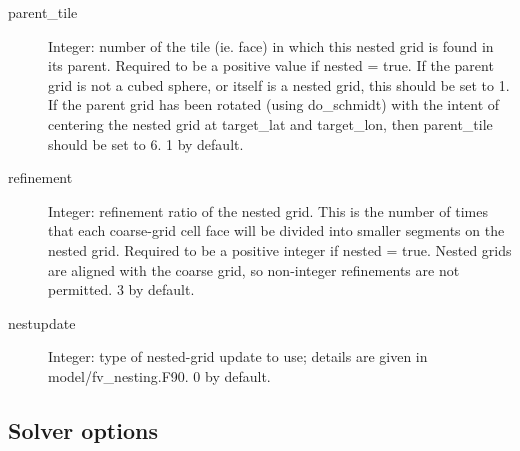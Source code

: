 \documentclass[12pt,letterpaper]{book}
\begin{document}
\begin{description}
\item[parent\_tile] Integer: number of the tile (ie. face) in which this nested grid is found in its parent. Required to be a positive value if nested 
= true. If the parent grid is not a cubed sphere, or itself is a nested grid, this should be set to 
1. If the parent grid has been rotated (using do\_schmidt) with the intent of centering the nested grid at target\_lat and target\_lon, then parent\_tile should be set to 
6. 1 by default. 


\item[refinement] Integer: refinement ratio of the nested grid. This is the number of times that each coarse-grid cell face will be divided into smaller segments on the nested grid. Required to be a positive integer if nested 
= true. Nested grids are aligned with the coarse grid, so non-integer refinements are not permitted. 
3 by default. 


\item[nestupdate] Integer: type of nested-grid update to use; details are given in model/fv\_nesting.F90. 
0 by default.

\end{description}

\subsection{Solver options}
\end{document}
